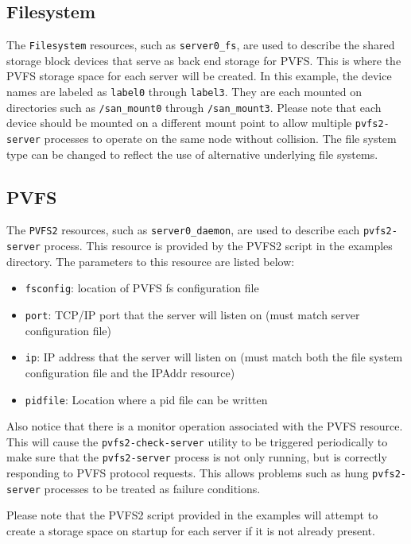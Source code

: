 \documentclass[11pt]{article}
\begin{document}
\subsection{Filesystem}

The \texttt{Filesystem} resources, such as \texttt{server0\_fs}, are used to
describe the shared storage block devices that serve as back end storage
for PVFS.  This is where the PVFS storage space for each server will
be created.  In this example, the device names are labeled as
\texttt{label0}
through \texttt{label3}.  They are each mounted on directories such
as \texttt{/san\_mount0} through \texttt{/san\_mount3}.  Please note
that each device should be mounted on a different mount point to allow
multiple \texttt{pvfs2-server} processes to operate on the same node without
collision.  The file system type can be changed to reflect the use of
alternative underlying file systems.

\subsection{PVFS}

The \texttt{PVFS2} resources, such as \texttt{server0\_daemon}, are used
to describe each \texttt{pvfs2-server} process.  This resource is provided by the
PVFS2 script in the examples directory.  The parameters to this resource
are listed below:
\begin{itemize}
\item \texttt{fsconfig}: location of PVFS fs configuration file
\item \texttt{port}: TCP/IP port that the server will listen on (must match server
configuration file)
\item \texttt{ip}: IP address that the server will listen on (must match both the file
system configuration file and the IPAddr resource)
\item \texttt{pidfile}: Location where a pid file can be written
\end{itemize}

Also notice that there is a monitor operation associated with the PVFS
resource.  This will cause the \texttt{pvfs2-check-server} utility to be triggered
periodically to make sure that the \texttt{pvfs2-server} process is not only
running, but is correctly responding to PVFS protocol requests.  This
allows problems such as hung \texttt{pvfs2-server} processes to be treated as
failure conditions.

Please note that the PVFS2 script provided in the examples will attempt
to create a storage space on startup for each server if it is not already present.
\end{document}
